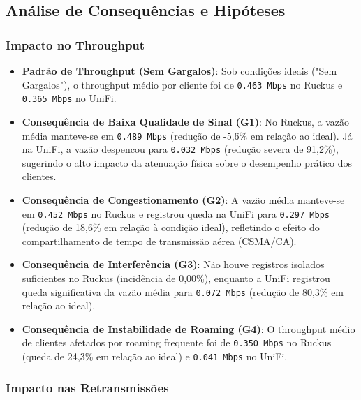 \subsection{Análise de Consequências e Hipóteses}

\subsubsection{Impacto no Throughput}

\begin{itemize}
  \item \textbf{Padrão de Throughput (Sem Gargalos)}: Sob condições ideais ("Sem Gargalos"), o throughput médio por cliente foi de \texttt{0.463 Mbps} no Ruckus e \texttt{0.365 Mbps} no UniFi.
  \item \textbf{Consequência de Baixa Qualidade de Sinal (G1)}: No Ruckus, a vazão média manteve-se em \texttt{0.489 Mbps} (redução de -5,6\% em relação ao ideal). Já na UniFi, a vazão despencou para \texttt{0.032 Mbps} (redução severa de 91,2\%), sugerindo o alto impacto da atenuação física sobre o desempenho prático dos clientes.
  \item \textbf{Consequência de Congestionamento (G2)}: A vazão média manteve-se em \texttt{0.452 Mbps} no Ruckus e registrou queda na UniFi para \texttt{0.297 Mbps} (redução de 18,6\% em relação à condição ideal), refletindo o efeito do compartilhamento de tempo de transmissão aérea (CSMA/CA).
  \item \textbf{Consequência de Interferência (G3)}: Não houve registros isolados suficientes no Ruckus (incidência de 0,00\%), enquanto a UniFi registrou queda significativa da vazão média para \texttt{0.072 Mbps} (redução de 80,3\% em relação ao ideal).
  \item \textbf{Consequência de Instabilidade de Roaming (G4)}: O throughput médio de clientes afetados por roaming frequente foi de \texttt{0.350 Mbps} no Ruckus (queda de 24,3\% em relação ao ideal) e \texttt{0.041 Mbps} no UniFi.

\end{itemize}
\subsubsection{Impacto nas Retransmissões}

